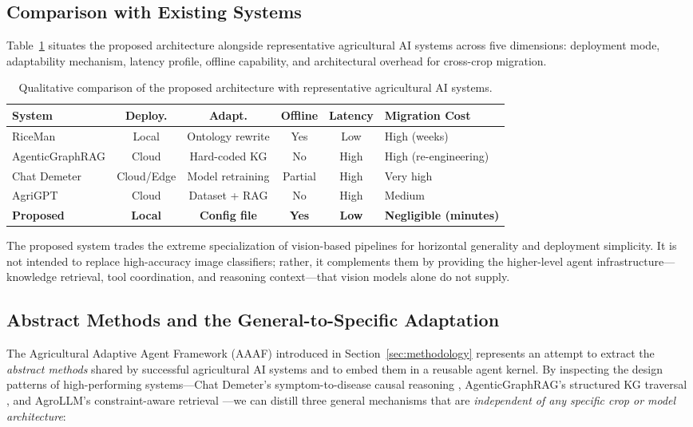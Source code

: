 \documentclass[11pt,a4paper]{article}
\begin{document}
\subsection{Comparison with Existing Systems}

Table~\ref{tab:comparison} situates the proposed architecture alongside representative agricultural AI systems across five dimensions: deployment mode, adaptability mechanism, latency profile, offline capability, and architectural overhead for cross-crop migration.

\begin{table}[htbp]
\centering
\caption{Qualitative comparison of the proposed architecture with representative agricultural AI systems.}
\label{tab:comparison}
\begin{tabular}{p{3.2cm}ccccp{2.8cm}}
\hline
\textbf{System} & \textbf{Deploy.} & \textbf{Adapt.} & \textbf{Offline} & \textbf{Latency} & \textbf{Migration Cost} \\
\hline
RiceMan \cite{jearanaiwongkul2021riceman} & Local & Ontology rewrite & Yes & Low & High (weeks) \\
AgenticGraphRAG \cite{agenticgraphrag2025} & Cloud & Hard-coded KG & No & High & High (re-engineering) \\
Chat Demeter \cite{chatdemeter2025} & Cloud/Edge & Model retraining & Partial & High & Very high \\
AgriGPT \cite{yang2025agrigpt} & Cloud & Dataset + RAG & No & High & Medium \\
\textbf{Proposed} & \textbf{Local} & \textbf{Config file} & \textbf{Yes} & \textbf{Low} & \textbf{Negligible (minutes)} \\
\hline
\end{tabular}
\end{table}

The proposed system trades the extreme specialization of vision-based pipelines for horizontal generality and deployment simplicity. It is not intended to replace high-accuracy image classifiers; rather, it complements them by providing the higher-level agent infrastructure---knowledge retrieval, tool coordination, and reasoning context---that vision models alone do not supply.

\subsection{Abstract Methods and the General-to-Specific Adaptation}

The Agricultural Adaptive Agent Framework (AAAF) introduced in Section~\ref{sec:methodology} represents an attempt to extract the \textit{abstract methods} shared by successful agricultural AI systems and to embed them in a reusable agent kernel. By inspecting the design patterns of high-performing systems---Chat Demeter's symptom-to-disease causal reasoning \cite{chatdemeter2025}, AgenticGraphRAG's structured KG traversal \cite{agenticgraphrag2025}, and AgroLLM's constraint-aware retrieval \cite{samuel2025agrollm}---we can distill three general mechanisms that are \textit{independent of any specific crop or model architecture}:
\end{document}
